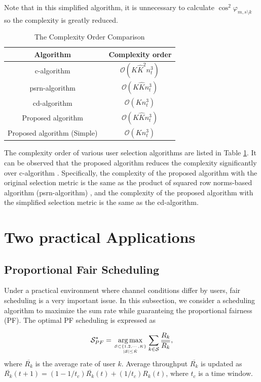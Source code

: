\documentclass[journal,twoside]{IEEEtranTCOM}
\begin{document}
Note that in this simplified algorithm, it is unnecessary to calculate ${\cos^2 \varphi_{{m}, s \setminus k }}$ so the complexity is greatly reduced.


\begin{table}[!tb]
\caption{The Complexity Order Comparison}
\label{Table:Complexity}
\centering
\begin{tabular} {|c|c|}
\hline
\textbf{Algorithm} &\ \textbf{Complexity order}\\
\hline
c-algorithm \cite{c_n} &\ ${\mathcal{O}}(K{{\hat K}^2}n_t^3)$ \\
\hline
psrn-algorithm \cite{SRN} &\ ${\mathcal{O}}(K{{\hat K}}n_t^3)$ \\
\hline
cd-algorithm \cite{CD_conf} &\ ${\mathcal{O}}(K n_t^3)$ \\
\hline
Proposed algorithm &\ ${\mathcal{O}}(K{\hat K}{n_t^3})$ \\
\hline
Proposed algorithm (Simple) &\ ${\mathcal{O}}(K{n_t^3})$ \\
\hline
\end{tabular}
\end{table}

The complexity order of various user selection algorithms are listed in Table \ref{Table:Complexity}. It can be observed that the proposed algorithm reduces the complexity significantly over c-algorithm \cite{c_n}. Specifically, the complexity of the proposed algorithm with the original selection metric is the same as the product of squared row norms-based algorithm (psrn-algorithm) \cite{SRN}, and the complexity of the proposed algorithm with the simplified selection metric is the same as the cd-algorithm.


\section{Two practical Applications} \label{Sec:PracticalIssues}
\subsection{Proportional Fair Scheduling}
Under a practical environment where channel conditions differ by users, fair scheduling is a very important issue. In this subsection, we consider a scheduling algorithm to maximize the sum rate while guaranteing the proportional fairness (PF). The optimal PF scheduling is expressed as

\begin{equation}
{{\mathcal{S}}_{PF}^*} = \mathop {\arg \max }\limits_{{\mathcal{S}} \subset \{ 1,2, \cdots ,K\} \atop
 | {\mathcal{S}} | \le \hat K} \sum\limits_{k \in {\mathcal{S}}} {\frac{{{R_k}}}{{\overline{R_k}}}},
\end{equation}
where ${\overline{R_k}}$ is the average rate of user $k$. Average throughput ${\overline{R_k}}$ is updated as ${\overline{R_k}}(t + 1) = (1 - 1/{t_c}){\overline{R_k}}(t) + (1/{t_c}){R_k}(t)$, where $t_c$ is a time window.
\end{document}
